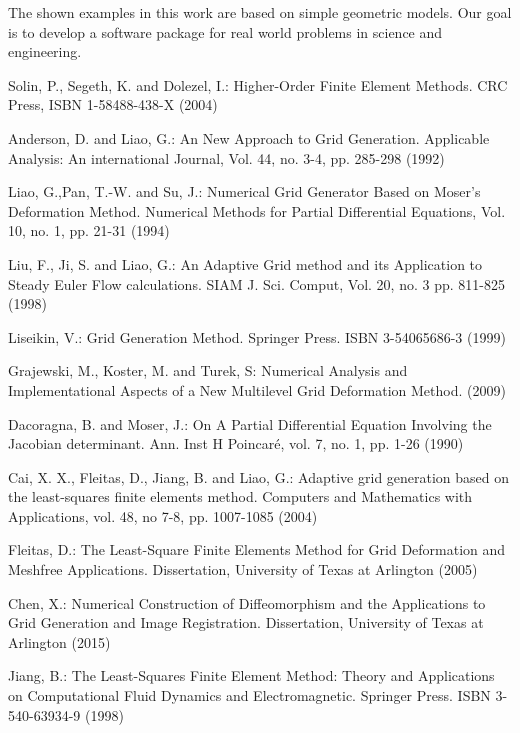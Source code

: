 \documentclass{article}
\theoremstyle{definition}
\theoremstyle{remark}
\numberwithin{equation}{section}
\numberwithin{subsection}{section}
\begin{document}
The shown examples in this work are based on simple geometric models. Our goal is to develop a software package for real world problems in science and engineering.
%
%
\begin{thebibliography}{11}
Solin, P., Segeth, K. and Dolezel, I.:
Higher-Order Finite Element Methods.
CRC Press, ISBN 1-58488-438-X (2004)

Anderson, D. and Liao, G.:
An New Approach to  Grid Generation. 
Applicable Analysis: An international Journal, Vol. 44, no. 3-4, pp. 285-298 (1992)

Liao, G.,Pan, T.-W. and Su, J.:
Numerical Grid Generator Based on Moser's Deformation Method.  
Numerical Methods for Partial Differential Equations, Vol. 10, no. 1, pp. 21-31 (1994)

Liu, F., Ji, S. and Liao, G.:
An Adaptive Grid method and its Application to Steady Euler Flow calculations. 
SIAM J. Sci. Comput, Vol. 20, no. 3 pp. 811-825 (1998)

Liseikin, V.:
Grid Generation Method.
Springer Press. ISBN 3-54065686-3 (1999)

Grajewski, M., Koster, M. and Turek, S:
Numerical Analysis and Implementational Aspects of a New Multilevel Grid Deformation Method. (2009)

Dacoragna, B. and Moser, J.:
On A Partial Differential Equation Involving the Jacobian determinant.
Ann. Inst H Poincaré, vol. 7, no. 1, pp. 1-26 (1990)

Cai, X. X., Fleitas, D., Jiang, B. and Liao, G.:
Adaptive grid generation based on the least-squares finite elements method.
Computers and Mathematics with Applications, vol. 48, no 7-8, pp. 1007-1085 (2004)

Fleitas, D.:
The Least-Square Finite Elements Method for Grid Deformation and Meshfree Applications. Dissertation, University of Texas at Arlington (2005)

Chen, X.:
Numerical Construction of Diffeomorphism and the Applications to Grid Generation and Image Registration. Dissertation, University of Texas at Arlington (2015)

Jiang, B.:
The Least-Squares Finite Element Method: Theory and Applications on Computational Fluid Dynamics and Electromagnetic.
Springer Press. ISBN 3-540-63934-9 (1998)

\end{thebibliography}
\end{document}
